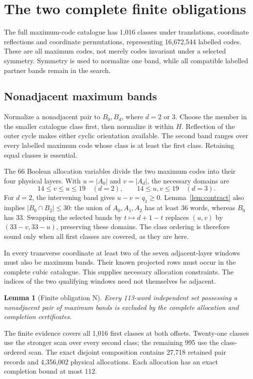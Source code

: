 \documentclass[11pt]{article}
\newtheorem{lemma}[theorem]{Lemma}
\theoremstyle{definition}
\begin{document}
\section{The two complete finite obligations}
The full maximum-code catalogue has 1,016 classes under translations,
coordinate reflections and coordinate permutations, representing
16,672,544 labelled codes. These are all maximum codes, not merely codes
invariant under a selected symmetry. Symmetry is used to normalize one
band, while all compatible labelled partner bands remain in the search.

\subsection{Nonadjacent maximum bands}
Normalize a nonadjacent pair to $B_0,B_d$, where $d=2$ or 3. Choose the
member in the smaller catalogue class first, then normalize it within $H$.
Reflection of the outer cycle makes either cyclic orientation available.
The second band ranges over every labelled maximum code whose class is
at least the first class. Retaining equal classes is essential.

The 66 Boolean allocation variables divide the two maximum codes into
their four physical layers. With $u=|A_0|$ and $v=|A_d|$, the necessary
domains are
\[
 14\leq v\leq u\leq19\quad(d=2),\qquad
 14\leq u,v\leq19\quad(d=3).
\]
For $d=2$, the intervening band gives $u-v=q_1\geq0$.
Lemma~\ref{lem:contract} also implies $|B_0\cap B_2|\leq30$:
the union of $A_0,A_1,A_2$ has at least 36 words, whereas $B_0$ has 33.
Swapping the selected bands by $t\mapsto d+1-t$ replaces $(u,v)$ by
$(33-v,33-u)$, preserving these domains. The class ordering is therefore
sound only when all first classes are covered, as they are here.

In every transverse coordinate at least two of the seven adjacent-layer
windows must also be maximum bands. Their known projected rows must occur
in the complete cubic catalogue. This supplies necessary allocation
constraints. The indices of the two qualifying windows need not themselves
be adjacent.

\begin{lemma}[Finite obligation N]\label{lem:N}
Every 113-word independent set possessing a nonadjacent pair of maximum
bands is excluded by the complete allocation and completion certificates.
\end{lemma}
The finite evidence covers all 1,016 first classes at both offsets.
Twenty-one classes use the stronger scan over every second class; the
remaining 995 use the class-ordered scan. The exact disjoint composition
contains 27,718 retained pair records and 4,356,002 physical allocations.
Each allocation has an exact completion bound at most 112.
\end{document}
